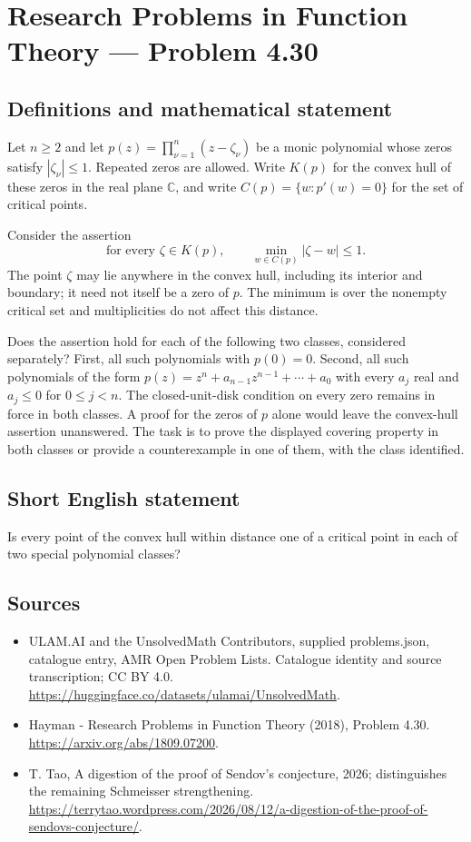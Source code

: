 \documentclass[11pt,a4paper]{article}
\begin{document}
\section*{Research Problems in Function Theory — Problem 4.30}\label{statement}

\subsection{Definitions and mathematical statement}
Let $n\geq2$ and let
$p(z)=\prod_{\nu=1}^{n}(z-\zeta_\nu)$ be a monic polynomial whose
zeros satisfy $|\zeta_\nu|\leq1$. Repeated zeros are allowed.
Write $K(p)$ for the convex hull of these zeros in the real
plane $\mathbb C$, and write $C(p)=\{w:p'(w)=0\}$ for the
set of critical points.

Consider the assertion
\[
 \text{for every }\zeta\in K(p),\qquad
     \min_{w\in C(p)}|\zeta-w|\leq1.
\]
The point $\zeta$ may lie anywhere in the convex hull, including
its interior and boundary; it need not itself be a zero of $p$.
The minimum is over the nonempty critical set and multiplicities
do not affect this distance.

Does the assertion hold for each of the following two classes,
considered separately?
First, all such polynomials with $p(0)=0$.
Second, all such polynomials of the form
$p(z)=z^n+a_{n-1}z^{n-1}+\cdots+a_0$ with every $a_j$ real and
$a_j\leq0$ for $0\leq j<n$.
The closed-unit-disk condition on every zero remains in force
in both classes. A proof for the zeros of $p$ alone would leave
the convex-hull assertion unanswered. The task is to prove the
displayed covering property in both classes or provide a
counterexample in one of them, with the class identified.
\subsection{Short English statement}
Is every point of the convex hull within distance one of a critical point in each of two special polynomial classes?
\subsection{Sources}
\begin{itemize}
\item[S1] ULAM.AI and the UnsolvedMath Contributors, supplied problems.json, catalogue entry, AMR Open Problem Lists. Catalogue identity and source transcription; CC BY 4.0.
\url{https://huggingface.co/datasets/ulamai/UnsolvedMath}.
\item[S2] Hayman - Research Problems in Function Theory (2018), Problem 4.30. 
\url{https://arxiv.org/abs/1809.07200}.
\item[S3] T. Tao, A digestion of the proof of Sendov's conjecture, 2026; distinguishes the remaining Schmeisser strengthening.
\url{https://terrytao.wordpress.com/2026/08/12/a-digestion-of-the-proof-of-sendovs-conjecture/}.
\end{itemize}
\end{document}

